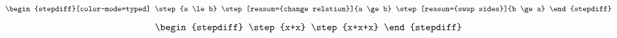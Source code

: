 \documentclass{article}
\begin{document}
\[
\begin{stepdiff}[color-mode=typed]
\step{a \le b}
\step[reason={change relation}]{a \ge b}
\step[reason={swap sides}]{b \ge a}
\end{stepdiff}
\]
\[
\begin{stepdiff}
\step{x+x}
\step{x+x+x}
\end{stepdiff}
\]
\end{document}
